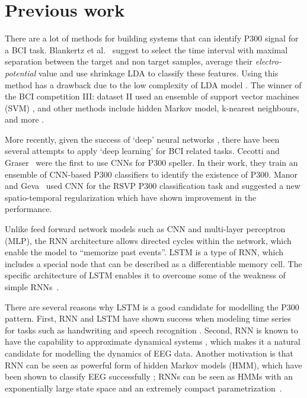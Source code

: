 \documentclass[
12pt, %
english, %
doublespacing, %
headsepline, %
]{MastersDoctoralThesis} %
\begin{document}
\chapter{Previous work}
There are a lot of methods for building systems that can identify P300 signal for a BCI task. Blankertz et al.~\cite{P300_Tutorial} suggest to select the time interval with maximal separation between the target and non target samples, average their \textit{electro-potential} value and use shrinkage LDA to classify these features. Using this method has a drawback due to the low complexity of LDA model \cite{cincotti2003comparison}. The winner of the BCI competition III: dataset II used an ensemble of support vector machines (SVM) \cite{P300SVMWinner}, and other methods include hidden Markov model, k-nearest neighbours, and more  \cite{cincotti2003comparison}.

More recently, given the success of `deep' neural networks \cite{krizhevsky2012imagenet}, there have been several attempts to apply `deep learning' for BCI related tasks. Cecotti and Graser~\cite{P300_CNN} were the first to use CNNs  for P300 speller. In their work, they train an ensemble of CNN-based P300 classifiers to identify the existence of P300. Manor and Geva~\cite{RSVP_P300_geva} used CNN for the RSVP P300 classification task and suggested a new spatio-temporal regularization which have shown improvement in the performance.


Unlike feed forward network models such as CNN and multi-layer perceptron (MLP),  the RNN architecture allows directed cycles within the network, which enable the model to ``memorize past events''. LSTM \cite{LSTM_origin} is a type of RNN, which includes a special node that can be described as a differentiable memory cell. The specific architecture of LSTM enables it to overcome some of the weakness of simple RNNs~\cite{bengio1994learning}.

There are several reasons why LSTM is a good candidate for modelling the P300 pattern. First, RNN and LSTM have shown success when modeling time series for tasks such as handwriting and speech recognition \cite{graves2013speech,  graves2008unconstrained, yue2015beyond}. Second, RNN is known to have the capability to approximate dynamical systems \cite{li2005approximation}, which makes it a natural candidate for modelling the dynamics of EEG data. Another motivation is that RNN can be seen as powerful form of hidden Markov models (HMM), which have been shown to classify EEG successfully \cite{solhjoo2005classification,obermaier2001hidden,cincotti2003comparison}; RNNs can be seen as HMMs with an exponentially large state space and an extremely compact parametrization~\cite{sutskever2009recurrent}.
\end{document}

